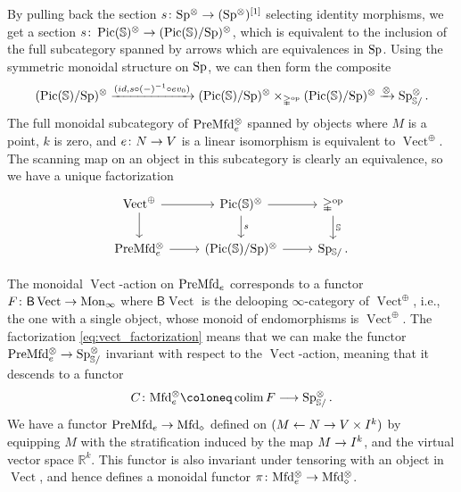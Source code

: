 \documentclass[10pt]{amsart}
\numberwithin{equation}{section}
\theoremstyle{definition}
\DeclareMathOperator{\Pic}{Pic}
\DeclareMathOperator{\op}{op}
\DeclareMathOperator{\Vect}{Vect}
\DeclareMathOperator*{\colim}{colim}
\newcommand{\Mfd}{\mathrm{Mfd}\vphantom{d}}
\newcommand{\PreMfd}{\mathrm{PreMfd}\vphantom{d}}
\newcommand{\bS}{\mathbb{S}}
\newcommand{\bR}{\mathbb{R}}
\newcommand{\Simp}{\mathbb{\Delta}}
\newcommand{\sfB}{\mathsf{B}}
\newcommand{\Mon}{\mathrm{Mon}_{\infty}}
\newcommand{\Sp}{\mathrm{Sp}\vphantom{p}}
\renewcommand{\to}{\mathchoice{\longrightarrow}{\rightarrow}{}{}}
\begin{document}
By pulling back the section $s\colon \Sp^{\otimes} \to (\Sp^{\otimes})^{[1]}$ selecting identity morphisms, we get a section $s\colon \Pic(\bS)^{\otimes} \to (\Pic(\bS)/\Sp)^{\otimes}$, which is equivalent to the inclusion of the full subcategory spanned by arrows which are equivalences in $\Sp$.
Using the symmetric monoidal structure on $\Sp$, we can then form the composite
\begin{align*}
	(\Pic(\bS)/\Sp)^{\otimes} \xrightarrow{(id, s\circ (-)^{-1}\circ ev_0 )} (\Pic(\bS)/\Sp)^{\otimes}\times_{\Simp^{\op}} (\Pic(\bS)/\Sp)^{\otimes} \xrightarrow{\otimes} \Sp_{\bS/}^{\otimes} \, .
\end{align*}
The full monoidal subcategory of $\PreMfd_{e}^{\otimes}$ spanned by objects where $M$ is a point, $k$ is zero, and $e\colon N \to V$ is a linear isomorphism is equivalent to $\Vect^{\oplus}$.
The scanning map on an object in this subcategory is clearly an equivalence, so we have a unique factorization
\begin{equation}\label{eq:vect_factorization}
	\begin{tikzcd}
		\Vect^{\oplus} \arrow[r] \arrow[d]      &   \Pic(\bS)^{\otimes}  \arrow[d, "s"]  \arrow[r] & \Simp^{\op}  \arrow[d, "\bS"] \\
		\PreMfd_{e}^{\otimes}  \arrow[r]               &   (\Pic(\bS)/\Sp )^{\otimes}  \arrow[r]            & \Sp_{\bS/} \,.
	\end{tikzcd}
\end{equation}



The monoidal $\Vect$-action on $\PreMfd_{e}$ corresponds to a functor $F \colon \sfB \Vect \to \Mon$ where $\sfB\Vect$ is the delooping $\infty$-category of $\Vect^{\oplus}$, i.e., the one with a single object, whose monoid of endomorphisms is $\Vect^{\oplus}$.
The factorization \eqref{eq:vect_factorization} means that we can make the functor $\PreMfd_{e}^{\otimes} \to \Sp_{\bS/}^{\otimes}$ invariant with respect to the $\Vect$-action, meaning that it descends to a functor
\begin{align*}
	C\colon \Mfd_{e}^{\otimes} \coloneq \colim F \to \Sp_{\bS/}^{\otimes} \,.
\end{align*}
We have a functor $\PreMfd_{e} \to \Mfd_{\diamond}$ defined on $(M\leftarrow N \to V\times I^{k})$ by equipping $M$ with the stratification induced by the map $M\to I^{k}$, and the virtual vector space $\bR^{k}$.
This functor is also invariant under tensoring with an object in $\Vect$, and hence defines a monoidal functor $\pi\colon \Mfd_{e}^{\otimes} \to \Mfd_{\diamond}^{\otimes}$.
\end{document}
